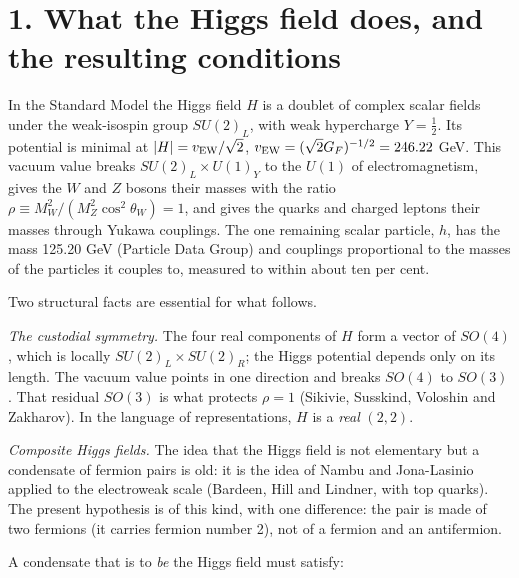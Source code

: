 \documentclass[
  10pt,
]{article}
\begin{document}
\hypertarget{what-the-higgs-field-does-and-the-resulting-conditions}{%
\section{1. What the Higgs field does, and the resulting
conditions}\label{what-the-higgs-field-does-and-the-resulting-conditions}}

In the Standard Model the Higgs field \(H\) is a doublet of complex
scalar fields under the weak-isospin group \(SU(2)_L\), with weak
hypercharge \(Y=\tfrac12\). Its potential is minimal at
\(|H|=v_{\rm EW}/\sqrt2\), \(v_{\rm EW}=(\sqrt2G_F)^{-1/2}=246.22\) GeV.
This vacuum value breaks \(SU(2)_L\times U(1)_Y\) to the \(U(1)\) of
electromagnetism, gives the \(W\) and \(Z\) bosons their masses with the
ratio \(\rho\equiv M_W^2/(M_Z^2\cos^2\theta_W)=1\), and gives the quarks
and charged leptons their masses through Yukawa couplings. The one
remaining scalar particle, \(h\), has the mass 125.20 GeV (Particle Data
Group) and couplings proportional to the masses of the particles it
couples to, measured to within about ten per cent.

Two structural facts are essential for what follows.

\emph{The custodial symmetry.} The four real components of \(H\) form a
vector of \(SO(4)\), which is locally \(SU(2)_L\times SU(2)_R\); the
Higgs potential depends only on its length. The vacuum value points in
one direction and breaks \(SO(4)\) to \(SO(3)\). That residual \(SO(3)\)
is what protects \(\rho=1\) (Sikivie, Susskind, Voloshin and Zakharov).
In the language of representations, \(H\) is a \emph{real} \((2,2)\).

\emph{Composite Higgs fields.} The idea that the Higgs field is not
elementary but a condensate of fermion pairs is old: it is the idea of
Nambu and Jona-Lasinio applied to the electroweak scale (Bardeen, Hill
and Lindner, with top quarks). The present hypothesis is of this kind,
with one difference: the pair is made of two fermions (it carries
fermion number 2), not of a fermion and an antifermion.

A condensate that is to \emph{be} the Higgs field must satisfy:
\end{document}
